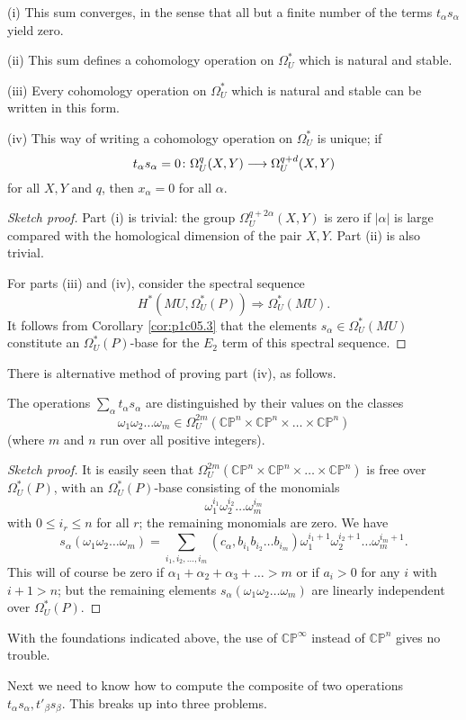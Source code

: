\documentclass[../main]{subfiles}
\begin{document}
\begin{theorem}[Novikov]\label{thm:pc1c06.1}
(i) This sum converges, in the sense that all but a finite number of the terms $t_\alpha s_\alpha$ yield zero.

(ii) This sum defines a cohomology operation on $\Omega^*_U$ which is natural and stable.

(iii) Every cohomology operation on $\Omega_U^*$ which is natural and stable can be written in this form.

(iv) This way of writing a cohomology operation on $\Omega_U^*$ is unique; if 
    \[t_\alpha s_\alpha = 0 \colon \Omega^q_U(X,Y) \longrightarrow \Omega^{q+d}_U(X,Y)\]
    for all $X,Y$ and $q$, then $x_\alpha = 0$ for all $\alpha$.
\end{theorem}
\begin{proof}[Sketch proof]
Part (i) is trivial: the group $\Omega_U^{q+2\alpha}(X,Y)$ is zero if $|\alpha|$ is large compared with the homological dimension of the pair $X,Y$. Part (ii) is also trivial.

For parts (iii) and (iv), consider the spectral sequence
\[H^*(MU,\Omega_U^*(P)) \Longrightarrow \Omega^*_U(MU).\]
It follows from Corollary \ref{cor:p1c05.3} that the elements $s_\alpha \in \Omega^*_U(MU)$ constitute an $\Omega_U^*(P)$-base for the $E_2$ term of this spectral sequence.
\end{proof}
There is alternative method of proving part (iv), as follows.
\begin{remark}[Novikov]\label{rmk:p1c06.2}
The operations $\sum_\alpha t_\alpha s_\alpha$ are distinguished by their values on the classes
\[\omega_1 \omega_2 \dots \omega_m \in \Omega_U^{2m}(\mathbb{CP}^n \times \mathbb{CP}^n \times \dots \times \mathbb{CP}^n)\]
(where $m$ and $n$ run over all positive integers).
\end{remark}
\begin{proof}[Sketch proof]
It is easily seen that $\Omega_U^{2m}(\mathbb{CP}^n \times \mathbb{CP}^n \times \dots \times \mathbb{CP}^n)$ is free over $\Omega_U^*(P)$, with an $\Omega_U^*(P)$-base consisting of the monomials 
\[\omega_1^{i_1} \omega_2^{i_2} \dots \omega_m^{i_m}\]
with $0 \leq i_r \leq n$ for all $r$; the remaining monomials are zero. We have \[s_\alpha(\omega_1\omega_2\dots\omega_m) = \sum_{i_1,i_2,\dots,i_m} (c_\alpha,b_{i_1} b_{i_2} \dots b_{i_m})\omega_1^{i_1 +1} \omega_2^{i_2+1} \dots \omega_m^{i_m + 1}.\]
This will of course be zero if $\alpha_1 + \alpha_2 + \alpha_3 + \dots > m$ or if $a_i > 0$ for any $i$ with $i+1 > n$; but the remaining elements $s_\alpha(\omega_1 \omega_2 \dots \omega_m)$ are linearly independent over $\Omega_U^*(P)$.
\end{proof}
\begin{note}
With the foundations indicated above, the use of $\mathbb{CP}^\infty$ instead of $\mathbb{CP}^n$ gives no trouble.
\end{note}
Next we need to know how to compute the composite of two operations $t_\alpha s_\alpha, t'_\beta s_\beta$. This breaks up into three problems.
\end{document}
